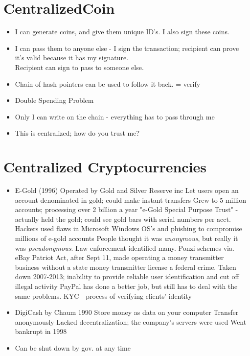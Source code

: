 \documentclass{article}
\begin{document}
\section*{CentralizedCoin}
\begin{itemize}
  \item I can generate coins, and give them unique ID's. I also sign these coins.
  \item I can pass them to anyone else - I sign the transaction; recipient can prove it's valid because it has my signature.\\
    Recipient can sign to pass to someone else. 
  \item Chain of hash pointers can be used to follow it back. = verify
  \item Double Spending Problem
  \item Only I can write on the chain - everything has to pass through me
  \item This is centralized; how do you trust me? 
\end{itemize}

\section*{Centralized Cryptocurrencies}
\begin{itemize}
  \item E-Gold (1996)
    \subitem Operated by Gold and Silver Reserve inc 
    \subitem Let users open an account denominated in gold; could make instant transfers
    \subitem Grew to 5 million accounts; processing over 2 billion a year
    \subitem "e-Gold Special Purpose Trust" - actually held the gold; could see gold bars with serial numbers per acct.
    \subitem Hackers used flaws in Microsoft Windows OS's and phishing to compromise millions of e-gold accounts
    \subitem People thought it was \emph{anonymous}, but really it was \emph{pseudonymous}. Law enforcement identified many.
    \subitem Ponzi schemes via. eBay 
    \subitem Patriot Act, after Sept 11, made operating a money transmitter business without a state money transmitter license a federal crime.
    \subitem Taken down 2007-2013; inability to provide reliable user identification and cut off illegal activity
    \subitem PayPal has done a better job, but still has to deal with the same problems.
    \subitem KYC - process of verifying clients' identity
  \item DigiCash by Chaum 1990
    \subitem Store money as data on your computer
    \subitem Transfer anonymously
    \subitem Lacked decentralization; the company's servers were used
    \subitem Went bankrupt in 1998
  \item Can be shut down by gov. at any time
\end{itemize}
\end{document}

